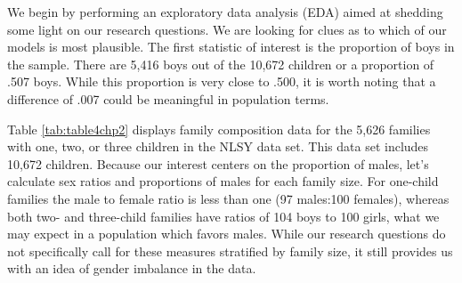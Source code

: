 \documentclass[
]{krantz}
\begin{document}
We begin by performing an exploratory data analysis (EDA) aimed at shedding some light on our research questions. We are looking for clues as to which of our models is most plausible. The first statistic of interest is the proportion of boys in the sample. There are 5,416 boys out of the 10,672 children or a proportion of .507 boys. While this proportion is very close to .500, it is worth noting that a difference of .007 could be meaningful in population terms.

\begin{table}

\caption{\label{tab:table4chp2}Number of families and children in families with given composition in NLSY data. Sex ratio and proportion males are given by family size.}
\centering
{}
\end{table}

Table \ref{tab:table4chp2} displays family composition data for the 5,626 families with one, two, or three children in the NLSY data set. This data set includes 10,672 children. Because our interest centers on the proportion of males, let's calculate sex ratios and proportions of males for each family size. For one-child families the male to female ratio is less than one (97 males:100 females), whereas both two- and three-child families have ratios of 104 boys to 100 girls, what we may expect in a population which favors males. While our research questions do not specifically call for these measures stratified by family size, it still provides us with an idea of gender imbalance in the data.
\end{document}
